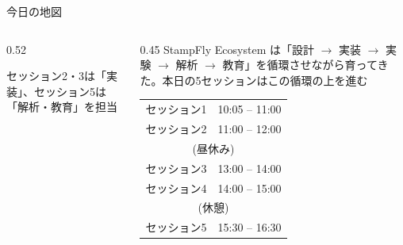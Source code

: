 \begin{frame}{今日の地図}
  \begin{columns}[T]
    \begin{column}{0.52\textwidth}
      \centering
      \vspace{-3mm}

      \vspace{0.1em}
      {\scriptsize セッション2・3は「実装」、セッション5は「解析・教育」を担当}
    \end{column}
    \begin{column}{0.45\textwidth}
      \small
      StampFly Ecosystem は「設計 $\to$ 実装 $\to$ 実験 $\to$ 解析 $\to$ 教育」を循環させながら育ってきた。本日の5セッションはこの循環の上を進む
      \vspace{0.5em}

      \begin{table}
        \centering\footnotesize
        \begin{tabular}{ll}
          \hline
          セッション1 & 10:05 -- 11:00 \\
          セッション2 & 11:00 -- 12:00 \\
          \multicolumn{2}{c}{(昼休み)} \\
          セッション3 & 13:00 -- 14:00 \\
          セッション4 & 14:00 -- 15:00 \\
          \multicolumn{2}{c}{(休憩)} \\
          セッション5 & 15:30 -- 16:30 \\
          \hline
        \end{tabular}
      \end{table}
    \end{column}
  \end{columns}
\end{frame}

